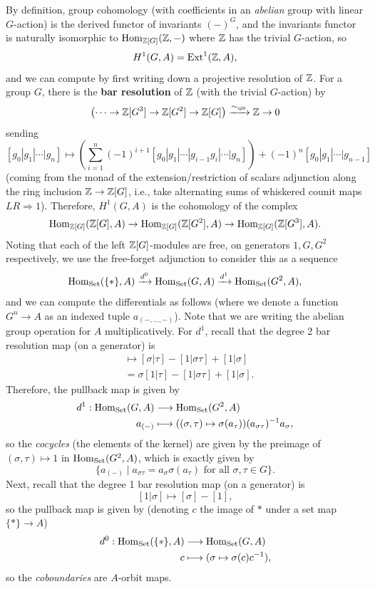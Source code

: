 \documentclass[12pt]{article}
\begin{document}
By definition, group cohomology (with coefficients in an \textit{abelian} group with linear $G$-action) is the derived functor of invariants $(-)^G$, and the invariants functor is naturally isomorphic to $\mathrm{Hom}_{\mathbb{Z}[G]}(\mathbb{Z},-)$ where $\mathbb{Z}$ has the trivial $G$-action, so
\[H^1(G,A) = \mathrm{Ext}^1(\mathbb{Z},A),\]
and we can compute by first writing down a projective resolution of $\mathbb{Z}$. For a group $G$, there is the \textbf{bar resolution} of $\mathbb{Z}$ (with the trivial $G$-action) by
\[\left( \cdots \to \mathbb{Z}[G^3] \to \mathbb{Z}[G^2] \to \mathbb{Z}[G] \right) \xrightarrow{\sim_{\text{qis}}} \mathbb{Z} \to 0\]
sending
\[[g_0|g_1|\cdots|g_n] \mapsto \left(\sum_{i=1}^n (-1)^{i+1} [g_0|g_1|\cdots|g_{i-1}g_i|\cdots|g_n]\right) + (-1)^n [g_0|g_1|\cdots|g_{n-1}]\]
(coming from the monad of the extension/restriction of scalars adjunction along the ring inclusion $\mathbb{Z}\to \mathbb{Z}[G]$, i.e., take alternating sums of whiskered counit maps $LR\Rightarrow 1$). Therefore, $H^1(G,A)$ is the cohomology of the complex
\[\mathrm{Hom}_{\mathbb{Z}[G]}(\mathbb{Z}[G],A) \to \mathrm{Hom}_{\mathbb{Z}[G]}(\mathbb{Z}[G^2], A) \to \mathrm{Hom}_{\mathbb{Z}[G]}(\mathbb{Z}[G^3], A).\]
Noting that each of the left $\mathbb{Z}[G]$-modules are free, on generators $1,G,G^2$ respectively, we use the free-forget adjunction to consider this as a sequence
\[\mathrm{Hom}_{\mathrm{Set}}(\{*\},A) \xrightarrow{d^0} \mathrm{Hom}_{\mathrm{Set}}(G,A) \xrightarrow{d^1} \mathrm{Hom}_{\mathrm{Set}}(G^2,A),\]
and we can compute the differentials as follows (where we denote a function $G^n\to A$ as an indexed tuple $a_{(-,\dots,-)}$). Note that we are writing the abelian group operation for $A$ multiplicatively. For $d^1$, recall that the degree 2 bar resolution map (on a generator) is
\begin{align*}
    [1|\sigma|\tau] &\mapsto [\sigma|\tau] - [1|\sigma\tau] + [1|\sigma]\\
    &= \sigma[1|\tau] - [1|\sigma\tau] + [1|\sigma].
\end{align*}
Therefore, the pullback map is given by
\begin{align*}
    d^1: \mathrm{Hom}_{\mathrm{Set}}(G,A) &\longrightarrow \mathrm{Hom}_{\mathrm{Set}}(G^2,A)\\
    a_{(-)} &\longmapsto ((\sigma,\tau) \mapsto \sigma(a_{\tau})) (a_{\sigma\tau})^{-1} a_{\sigma},
\end{align*}
so the \textit{cocycles} (the elements of the kernel) are given by the preimage of $(\sigma,\tau)\mapsto 1$ in $\mathrm{Hom}_{\mathrm{Set}}(G^2,A)$, which is exactly given by
\[
    \{a_{(-)} \mid a_{\sigma\tau} = a_\sigma \sigma(a_\tau) \text{ for all $\sigma,\tau\in G$}\}.
\]
Next, recall that the degree 1 bar resolution map (on a generator) is
\[[1|\sigma] \mapsto [\sigma] - [1],\]
so the pullback map is given by (denoting $c$ the image of $*$ under a set map $\{*\}\to A$)
\begin{align*}
    d^0: \mathrm{Hom}_{\mathrm{Set}}(\{*\},A) &\longrightarrow \mathrm{Hom}_{\mathrm{Set}}(G,A)\\
    c &\longmapsto (\sigma \mapsto \sigma(c)c^{-1}),
\end{align*}
so the \textit{coboundaries} are $A$-orbit maps.
\end{document}
